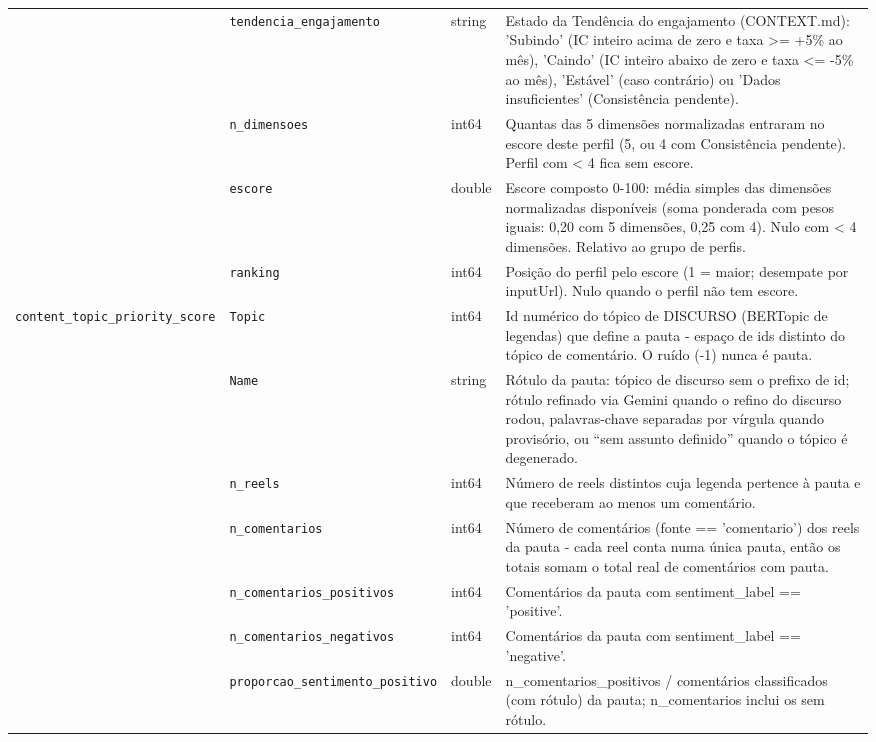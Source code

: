 \begin{footnotesize}
\begin{longtable}{p{3.2cm}p{3.0cm}p{2.0cm}p{6.0cm}}
\texttt{} & \texttt{tendencia\_\allowbreak{}engajamento} & string & Estado da Tendência do engajamento (CONTEXT.md): 'Subindo' (IC inteiro acima de zero e taxa >= +5\% ao mês), 'Caindo' (IC inteiro abaixo de zero e taxa <= -5\% ao mês), 'Estável' (caso contrário) ou 'Dados insuficientes' (Consistência pendente). \\
\texttt{} & \texttt{n\_\allowbreak{}dimensoes} & int64 & Quantas das 5 dimensões normalizadas entraram no escore deste perfil (5, ou 4 com Consistência pendente). Perfil com < 4 fica sem escore. \\
\texttt{} & \texttt{escore} & double & Escore composto 0-100: média simples das dimensões normalizadas disponíveis (soma ponderada com pesos iguais: 0,20 com 5 dimensões, 0,25 com 4). Nulo com < 4 dimensões. Relativo ao grupo de perfis. \\
\texttt{} & \texttt{ranking} & int64 & Posição do perfil pelo escore (1 = maior; desempate por inputUrl). Nulo quando o perfil não tem escore. \\
\texttt{content\_\allowbreak{}topic\_\allowbreak{}priority\_\allowbreak{}score} & \texttt{Topic} & int64 & Id numérico do tópico de DISCURSO (BERTopic de legendas) que define a pauta - espaço de ids distinto do tópico de comentário. O ruído (-1) nunca é pauta. \\
\texttt{} & \texttt{Name} & string & Rótulo da pauta: tópico de discurso sem o prefixo de id; rótulo refinado via Gemini quando o refino do discurso rodou, palavras-chave separadas por vírgula quando provisório, ou ``sem assunto definido'' quando o tópico é degenerado. \\
\texttt{} & \texttt{n\_\allowbreak{}reels} & int64 & Número de reels distintos cuja legenda pertence à pauta e que receberam ao menos um comentário. \\
\texttt{} & \texttt{n\_\allowbreak{}comentarios} & int64 & Número de comentários (fonte == 'comentario') dos reels da pauta - cada reel conta numa única pauta, então os totais somam o total real de comentários com pauta. \\
\texttt{} & \texttt{n\_\allowbreak{}comentarios\_\allowbreak{}positivos} & int64 & Comentários da pauta com sentiment\_\allowbreak{}label == 'positive'. \\
\texttt{} & \texttt{n\_\allowbreak{}comentarios\_\allowbreak{}negativos} & int64 & Comentários da pauta com sentiment\_\allowbreak{}label == 'negative'. \\
\texttt{} & \texttt{proporcao\_\allowbreak{}sentimento\_\allowbreak{}positivo} & double & n\_\allowbreak{}comentarios\_\allowbreak{}positivos /\allowbreak{} comentários classificados (com rótulo) da pauta; n\_\allowbreak{}comentarios inclui os sem rótulo. \\

\end{longtable}
\end{footnotesize}
